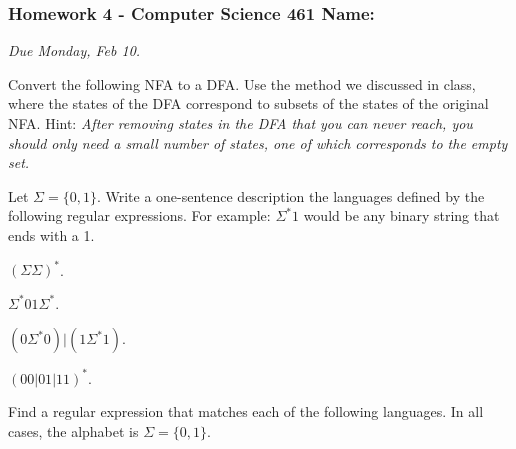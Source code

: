 \documentclass[12pt]{exam}
\begin{document}
\pagestyle{empty}
\subsubsection*{Homework 4 - Computer Science 461 \hfill Name: \underline{\hspace*{2in}}}

\textit{Due Monday, Feb 10.} %

\begin{questions}

\question Convert the following NFA to a DFA. Use the method we discussed in class, where the states of the DFA correspond to subsets of the states of the original NFA.  Hint: \textit{After removing states in the DFA that you can never reach, you should only need a small number of states, one of which corresponds to the empty set.}
\begin{flushright}
\end{flushright}
\vfill

\question Let $\Sigma = \{0,1\}$.  Write a one-sentence description the languages defined by the following regular expressions.  For example: $\Sigma^*1$ would be any binary string that ends with a 1. 
\begin{parts}
\item $(\Sigma \Sigma)^*$. 
\vfill

\item $\Sigma^*01\Sigma^*$. 
\vfill

\item $(0\Sigma^*0)|(1\Sigma^*1)$.
\vfill

\item $(00|01|11)^*$.
\vfill
\end{parts}



\newpage
\question Find a regular expression that matches each of the following languages. In all cases, the alphabet is $\Sigma = \{0,1\}$.  
\begin{parts}

\end{parts}
\end{questions}
\end{document}

